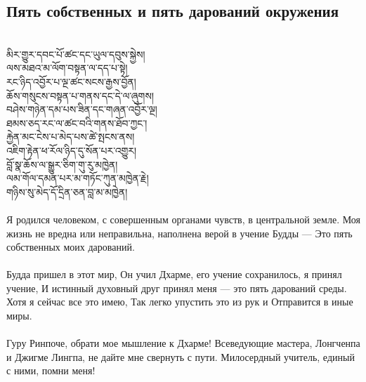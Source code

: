 \subsection*{Пять собственных и пять дарований окружения}
\\
\ti
མིར་གྱུར་དབང་པོ་ཚང་དང་ཡུལ་དབུས་སྐྱེས།\\
ལས་མཐའ་མ་ལོག་བསྟན་ལ་དད་པ་སྟེ།\\
རང་ཉིད་འབྱོར་པ་ལྔ་ཚང་སངས་རྒྱས་བྱོན། \\
ཆོས་གསུངས་བསྟན་པ་གནས་དང་དེ་ལ་ཞུགས།\\
བཤེས་གཉེན་དམ་པས་ཟིན་དང་གཞན་འབྱོར་ལྔ།\\
ཐམས་ཅད་རང་ལ་ཚང་བའི་གནས་ཐོབ་ཀྱང༌།\\
རྐྱེན་མང་ངེས་པ་མེད་པས་ཚེ་སྤངས་ནས།\\
འཇིག་རྟེན་ཕ་རོལ་ཉིད་དུ་སོན་པར་འགྱུར།\\
བློ་སྣ་ཆོས་ལ་སྒྱུར་ཅིག་གུ་རུ་མཁྱེན།\\
ལམ་གོལ་དམན་པར་མ་གཏོང་ཀུན་མཁྱེན་རྗེ།\\
གཉིས་སུ་མེད་དོ་དྲིན་ཅན་བླ་མ་མཁྱེན།\\
\\
\ru
Я родился человеком, с совершенным органами чувств,
в центральной земле. Моя жизнь не вредна или неправильна,
 наполнена верой в учение Будды — Это пять собственных моих дарований.\\
 \\
Будда пришел в этот мир, Он учил Дхарме, его учение сохранилось, я принял учение,
И истинный духовный друг принял меня — 
это пять дарований среды. Хотя я сейчас все это имею,
Так легко упустить это из рук и
Отправится в иные миры.\\
\\
Гуру Ринпоче, обрати мое мышление к Дхарме!
Всеведующие мастера, Лонгченпа и Джигме Лингпа,
не дайте мне свернуть с пути.
Милосердный учитель, единый с ними, помни меня!\\

\newpage

